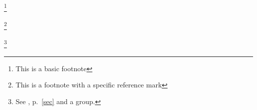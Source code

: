 \documentclass[12pt]{article}
\newcommand\"{quote}
\begin{document}
\footnote{This is a basic footnote}

\footnote [ 5 ] {This is a footnote with a specific reference mark}

\footnote{See \citet{key}, p.~\ref{sec} and {a group}.}
\end{document}
